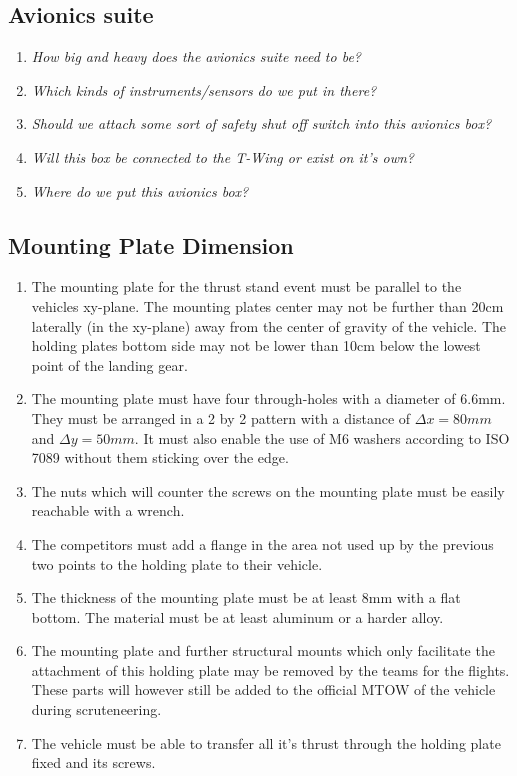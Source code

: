 \documentclass{article}
\begin{document}
\subsection{Avionics suite}
\begin{enumerate}
  \item \emph{How big and heavy does the avionics suite need to be?}
  \item \emph{Which kinds of instruments/sensors do we put in there?}
  \item \emph{Should we attach some sort of safety shut off switch into this avionics box?}
  \item \emph{Will this box be connected to the T-Wing or exist on it's own?}
  \item \emph{Where do we put this avionics box?}
\end{enumerate}

\subsection{Mounting Plate Dimension}
\begin{enumerate}
  \item The mounting plate for the thrust stand event must be parallel to the vehicles xy-plane. The mounting plates center may not be further than 20cm laterally (in the xy-plane) away from the center of gravity of the vehicle. The holding plates bottom side may not be lower than 10cm below the lowest point of the landing gear. 
  \item The mounting plate must have four through-holes with a diameter of 6.6mm. They must be arranged in a 2 by 2 pattern with a distance of ${\Delta}x=80mm$ and ${\Delta}y=50mm$. It must also enable the use of M6 washers according to ISO 7089 without them sticking over the edge.
  \item The nuts which will counter the screws on the mounting plate must be easily reachable with a wrench.  
  \item The competitors must add a flange in the area not used up by the previous two points to the holding plate to their vehicle. 
  \item The thickness of the mounting plate must be at least 8mm with a flat bottom. The material must be at least aluminum or a harder alloy.
  \item The mounting plate and further structural mounts which only facilitate the attachment of this holding plate may be removed by the teams for the flights. These parts will however still be added to the official MTOW of the vehicle during scruteneering.
  \item The vehicle must be able to transfer all it's thrust through the holding plate fixed and its screws. 
\end{enumerate}
\end{document}
